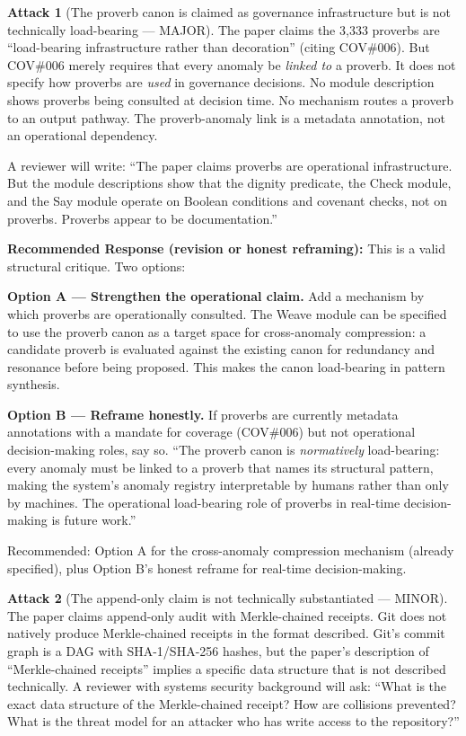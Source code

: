\documentclass[12pt,a4paper]{article}
\theoremstyle{definition}
\newtheorem{attack}{Attack}[section]
\begin{document}
\begin{attack}[The proverb canon is claimed as governance infrastructure but is not technically load-bearing — MAJOR]
\label{att:provinfra}
The paper claims the 3,333 proverbs are ``load-bearing infrastructure rather
than decoration'' (citing COV\#006). But COV\#006 merely requires that every
anomaly be \emph{linked to} a proverb. It does not specify how proverbs are
\emph{used} in governance decisions. No module description shows proverbs
being consulted at decision time. No mechanism routes a proverb to an output
pathway. The proverb-anomaly link is a metadata annotation, not an operational
dependency.

A reviewer will write: ``The paper claims proverbs are operational infrastructure.
But the module descriptions show that the dignity predicate, the Check module,
and the Say module operate on Boolean conditions and covenant checks, not on
proverbs. Proverbs appear to be documentation.''
\end{attack}

\begin{mdframed}[style=defenseframe]
\textbf{Recommended Response (revision or honest reframing):}
This is a valid structural critique. Two options:

\textbf{Option A — Strengthen the operational claim.} Add a mechanism by which
proverbs are operationally consulted. The Weave module can be specified to use
the proverb canon as a target space for cross-anomaly compression: a candidate
proverb is evaluated against the existing canon for redundancy and resonance
before being proposed. This makes the canon load-bearing in pattern synthesis.

\textbf{Option B — Reframe honestly.} If proverbs are currently metadata
annotations with a mandate for coverage (COV\#006) but not operational
decision-making roles, say so. ``The proverb canon is \emph{normatively}
load-bearing: every anomaly must be linked to a proverb that names its
structural pattern, making the system's anomaly registry interpretable
by humans rather than only by machines. The operational load-bearing role
of proverbs in real-time decision-making is future work.''

Recommended: Option A for the cross-anomaly compression mechanism
(already specified), plus Option B's honest reframe for real-time
decision-making.
\end{mdframed}

\begin{attack}[The append-only claim is not technically substantiated — MINOR]
\label{att:appendonly}
The paper claims append-only audit with Merkle-chained receipts. Git does not
natively produce Merkle-chained receipts in the format described. Git's commit
graph is a DAG with SHA-1/SHA-256 hashes, but the paper's description of
``Merkle-chained receipts'' implies a specific data structure that is not described
technically. A reviewer with systems security background will ask: ``What is
the exact data structure of the Merkle-chained receipt? How are collisions
prevented? What is the threat model for an attacker who has write access to
the repository?''
\end{attack}
\end{document}

